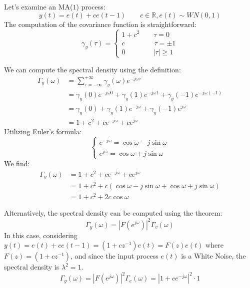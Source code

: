 \begin{example}
    Let's examine an MA($1$) process:
    \[y(t)=e(t)+ce(t-1)\qquad c\in\mathbb{R},e(t)\sim WN(0,1)\]
    The computation of the covariance function is straightforward:
    \[\gamma_y(\tau)=\begin{cases}
        1+c^2 \qquad \tau=0 \\
        c \qquad\qquad\: \tau=\pm 1 \\
        0 \qquad\qquad \left\lvert \tau\right\rvert \geq 1
    \end{cases}\]

    We can compute the spectral density using the definition:
    \begin{align*}
        \Gamma_y(\omega)    &=\sum_{\tau=-\infty}^{+\infty}\gamma_y(\omega)e^{-j\omega\tau} \\
                            &=\gamma_y(0)e^{-j\omega 0} + \gamma_y(1)e^{-j\omega 1} +\gamma_y(-1)e^{-j\omega(-1)} \\
                            &=\gamma_y(0) + \gamma_y(1)e^{-j\omega} +\gamma_y(-1)e^{j\omega} \\
                            &=1+c^2 + ce^{-j\omega} +ce^{j\omega}                  
    \end{align*}
    Utilizing Euler's formula:
    \[\begin{cases}
        e^{-j\omega}= \cos\omega-j\sin\omega \\
        e^{j\omega}= \cos\omega+j\sin\omega
    \end{cases}\]
    We find:
    \begin{align*}
        \Gamma_y(\omega)    &=1+c^2 + ce^{-j\omega} +ce^{j\omega} \\        
                            &=1+c^2 + c\left(\cos\omega-j\sin\omega+\cos\omega+j\sin\omega\right) \\    
                            &=1+c^2 + 2c\cos\omega                               
    \end{align*}

    Alternatively, the spectral density can be computed using the theorem:
    \[\Gamma_y(\omega)=\left\lvert F(e^{j\omega})\right\rvert^2 \Gamma_v(\omega)\]
    In this case, considering $y(t)=e(t)+ce(t-1)=\left(1+cz^{-1}\right)e(t)=F(z)e(t)$ where $F(z)=\left(1+cz^{-1}\right)$, and since the input process $e(t)$ is a White Noise, the spectral density is $\lambda^2=1$.
    \[\Gamma_y(\omega)=\left\lvert F(e^{j\omega})\right\rvert^2 \Gamma_e(\omega)=\left\lvert 1+ce^{-j\omega}\right\rvert^2 \cdot 1\]
    

\end{example}
